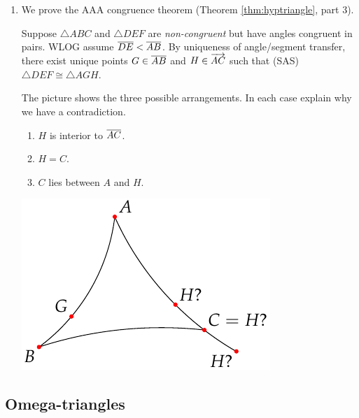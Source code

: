 \begin{exercises}
\begin{enumerate}
	  \item\label{exs:aaacongproof} We prove the AAA congruence theorem (Theorem \ref{thm:hyptriangle}, part 3).\par
	  Suppose $\triangle ABC$ and $\triangle DEF$ are \emph{non-congruent} but have angles congruent in pairs. WLOG assume $\overline{DE}<\overline{AB}$. By uniqueness of angle/segment transfer, there exist unique points $G\in\overline{AB}$ and $H\in\overrightarrow{AC}$ such that (SAS) $\triangle DEF\cong\triangle AGH$.\par
	  \begin{minipage}[t]{0.6\linewidth}\vspace{-8pt}
	  	The picture shows the three possible arrangements. In each case explain why we have a contradiction.
	  	\begin{enumerate}\itemsep0pt
	    	\item $H$ is interior to $\overline{AC}$.
	    	\item $H=C$.
	    	\item $C$ lies between $A$ and $H$.
	  	\end{enumerate}
	   \end{minipage}
	   \hfill
	   \begin{minipage}[t]{0.39\linewidth}\vspace{-25pt}
	    \flushright\includegraphics[scale=0.95]{basic-aaa}
	   \end{minipage}
	\end{enumerate}
\end{exercises}
\fi

\clearpage



\subsection{Omega-triangles}\label{sec:omegatri}

